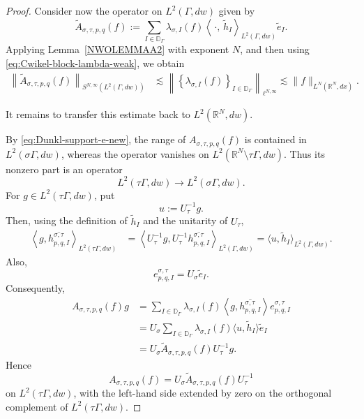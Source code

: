 \documentclass[12pt]{amsart}
\begin{document}
\begin{proof}
Consider now the operator on $L^2(\Gamma,dw)$ given by
\begin{equation}\label{eq:Cwikel-pullback-block}
\widetilde A_{\sigma,\tau,p,q}(f)
:=
\sum_{I\in\mathbb D_\Gamma}
\lambda_{\sigma,I}(f)
\left\langle
\,\cdot,\,
\widetilde h_I
\right\rangle_{L^2(\Gamma,dw)}
\widetilde e_I.
\end{equation}
Applying Lemma~\ref{NWOLEMMAA2} with exponent $N$, and then
using \eqref{eq:Cwikel-block-lambda-weak}, we obtain
\begin{align}
\left\|
\widetilde A_{\sigma,\tau,p,q}(f)
\right\|_
{S^{N,\infty}(L^2(\Gamma,dw))}
&\lesssim
\left\|
\left\{
\lambda_{\sigma,I}(f)
\right\}_{I\in\mathbb D_\Gamma}
\right\|_{\ell^{N,\infty}}\lesssim
\|f\|_{L^N(\mathbb R^N,dx)}.
\label{eq:Cwikel-pullback-block-estimate}
\end{align}

It remains to transfer this estimate back to
$L^2(\mathbb R^N,dw)$.

By \eqref{eq:Dunkl-support-e-new}, the range of
$A_{\sigma,\tau,p,q}(f)$ is contained in
$L^2(\sigma\Gamma,dw)$, whereas the operator vanishes on
$L^2(\mathbb R^N\setminus\tau\Gamma,dw)$. Thus its nonzero part is an
operator
\[
L^2(\tau\Gamma,dw)
\longrightarrow
L^2(\sigma\Gamma,dw).
\]
For $g\in L^2(\tau\Gamma,dw)$, put
\[
u:=U_\tau^{-1}g.
\]
Then, using the definition of $\widetilde h_I$ and the unitarity of
$U_\tau$,
\begin{align*}
\left\langle
g,
\overline{h_{p,q,I}^{\sigma,\tau}}
\right\rangle_{L^2(\tau\Gamma,dw)}
&=
\left\langle
U_\tau^{-1}g,
U_\tau^{-1}
\overline{h_{p,q,I}^{\sigma,\tau}}
\right\rangle_{L^2(\Gamma,dw)}
=
\langle u,\widetilde h_I\rangle_{L^2(\Gamma,dw)}.
\end{align*}
Also,
\[
e_{p,q,I}^{\sigma,\tau}
=
U_\sigma\widetilde e_I.
\]
Consequently,
\begin{align*}
A_{\sigma,\tau,p,q}(f)g
&=
\sum_{I\in\mathbb D_\Gamma}
\lambda_{\sigma,I}(f)
\left\langle
g,
\overline{h_{p,q,I}^{\sigma,\tau}}
\right\rangle
e_{p,q,I}^{\sigma,\tau}
\\
&=
U_\sigma
\sum_{I\in\mathbb D_\Gamma}
\lambda_{\sigma,I}(f)
\langle u,\widetilde h_I\rangle
\widetilde e_I
\\
&=
U_\sigma
\widetilde A_{\sigma,\tau,p,q}(f)
U_\tau^{-1}g.
\end{align*}
Hence
\begin{equation}\label{eq:Cwikel-block-unitary-equivalence}
A_{\sigma,\tau,p,q}(f)
=
U_\sigma
\widetilde A_{\sigma,\tau,p,q}(f)
U_\tau^{-1}
\end{equation}
on $L^2(\tau\Gamma,dw)$, with the left-hand side extended by zero on
the orthogonal complement of $L^2(\tau\Gamma,dw)$.


\end{proof}
\end{document}
